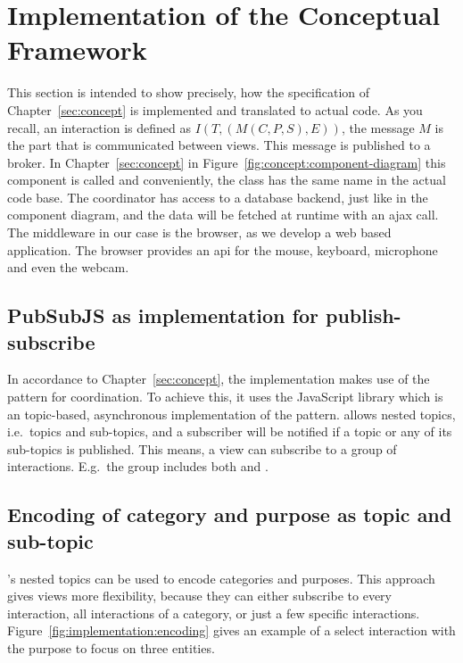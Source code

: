 \section{Implementation of the Conceptual Framework}
This section is intended to show precisely, how the specification of Chapter~\ref{sec:concept} is implemented and translated to actual code.
As you recall, an interaction is defined as $I(T,(M(C,P,S),E))$, the message $M$ is the part that is communicated between views.
This message is published to a  broker.
In Chapter~\ref{sec:concept} in Figure~\ref{fig:concept:component-diagram} this component is called  and conveniently, the class has the same name in the actual code base.
The coordinator has access to a database backend, just like in the component diagram, and the data will be fetched at runtime with an \gls{ajax} call.
The  middleware in our case is the browser, as we develop a web based application.
The browser provides an \gls{api} for the mouse, keyboard, microphone and even the webcam.

\subsection{PubSubJS as implementation for publish-subscribe}
In accordance to Chapter~\ref{sec:concept}, the implementation makes use of the  pattern for coordination.
To achieve this, it uses the JavaScript library  which is an topic-based, asynchronous implementation of the pattern.
 allows nested topics, i.e.\ topics and sub-topics, and a subscriber will be notified if a topic or any of its sub-topics is published.
This means, a view can subscribe to a group of interactions.
E.g.\ the group  includes both  and .

\subsection{Encoding of category and purpose as topic and sub-topic}
's nested topics can be used to encode categories and purposes.
This approach gives views more flexibility, because they can either subscribe to every interaction, all interactions of a category, or just a few specific interactions.
Figure~\ref{fig:implementation:encoding} gives an example of a select interaction with the purpose to focus on three entities.

